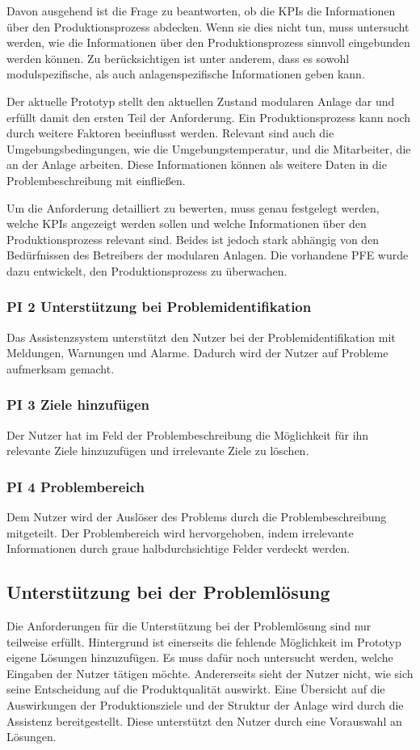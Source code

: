 
Davon ausgehend ist die Frage zu beantworten, ob die KPIs die Informationen über den Produktionsprozess abdecken. Wenn sie dies nicht tun, muss untersucht werden, wie die Informationen über den Produktionsprozess sinnvoll eingebunden werden können. Zu berücksichtigen ist unter anderem, dass es sowohl modulspezifische, als auch anlagenspezifische Informationen geben kann.

Der aktuelle Prototyp stellt den aktuellen Zustand modularen Anlage dar und erfüllt damit den ersten Teil der Anforderung. Ein Produktionsprozess kann noch durch weitere Faktoren beeinflusst werden. Relevant sind auch die Umgebungsbedingungen, wie die Umgebungstemperatur, und die Mitarbeiter, die an der Anlage arbeiten. Diese Informationen können als weitere Daten in die Problembeschreibung mit einfließen. 

Um die Anforderung detailliert zu bewerten, muss genau festgelegt werden, welche KPIs angezeigt werden sollen und welche Informationen über den Produktionsprozess relevant sind. Beides ist jedoch stark abhängig von den Bedürfnissen des Betreibers der modularen Anlagen. Die vorhandene PFE wurde dazu entwickelt, den Produktionsprozess zu überwachen.

\subsubsection*{PI 2 Unterstützung bei Problemidentifikation}
Das Assistenzsystem unterstützt den Nutzer bei der Problemidentifikation mit Meldungen, Warnungen und Alarme. Dadurch wird der Nutzer auf Probleme aufmerksam gemacht.

\subsubsection*{PI 3 Ziele hinzufügen}
Der Nutzer hat im Feld der Problembeschreibung die Möglichkeit für ihn relevante Ziele hinzuzufügen und irrelevante Ziele zu löschen.

\subsubsection*{PI 4 Problembereich}
Dem Nutzer wird der Auslöser des Problems durch die Problembeschreibung mitgeteilt. Der Problembereich wird hervorgehoben, indem irrelevante Informationen durch graue halbdurchsichtige Felder verdeckt werden.

\subsection{Unterstützung bei der Problemlösung}
Die Anforderungen für die Unterstützung bei der Problemlösung sind nur teilweise erfüllt. Hintergrund ist einerseits die fehlende Möglichkeit im Prototyp eigene Lösungen hinzuzufügen. Es muss dafür noch untersucht werden, welche Eingaben der Nutzer tätigen möchte. Andererseits sieht der Nutzer nicht, wie sich seine Entscheidung auf die Produktqualität auswirkt. Eine Übersicht auf die Auswirkungen der Produktionsziele und der Struktur der Anlage wird durch die Assistenz bereitgestellt. Diese unterstützt den Nutzer durch eine Vorauswahl an Lösungen.

